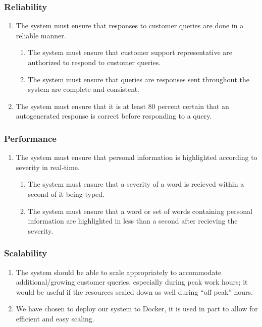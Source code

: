 \documentclass[11pt]{article}
\begin{document}
\subsubsection{Reliability}
\begin{enumerate}[label=R1.\arabic*.]
	\item The system must ensure that responses to customer queries are done in a reliable manner.
	\begin{enumerate}[label*=\arabic*.]
		\item The system must ensure that customer support representative are authorized to respond to customer queries.
		\item The system must ensure that queries are responses sent throughout the system are complete and consistent.
	\end{enumerate}
	\item The system must ensure that it is at least 80 percent certain that an autogenerated response is correct before responding to a query.
\end{enumerate}

\subsubsection{Performance}
\begin{enumerate}[label=R1.\arabic*.]
	\item The system must ensure that personal information is highlighted according to severity in real-time.
	\begin{enumerate}[label*=\arabic*.]
		\item The system must ensure that a severity of a word is recieved within a second of it being typed.
		\item The system must ensure that a word or set of words containing personal information are highlighted in less than a second after recieving the severity.
	\end{enumerate}
\end{enumerate}

\subsubsection{Scalability}
\begin{enumerate}
	\item The system should be able to scale appropriately to accommodate additional/growing customer queries, especially during peak work hours; it would be useful if the resources scaled down as well during “off peak” hours.
	\item We have chosen to deploy our system to Docker, it is used in part to allow for efficient and easy scaling.%
\end{enumerate}
\end{document}
